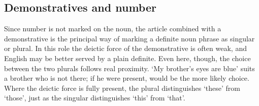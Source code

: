 \subsection{Demonstratives and number}\label{sec:dem-number}
Since number is not marked on the noun, the article combined with a demonstrative is the principal way of marking a definite noun phrase as singular or plural.
In this role the deictic force of the demonstrative is often weak, and English may be better served by a plain definite.
Even here, though, the choice between the two plurals follows real proximity.  `My brother's eyes are blue' suits a brother who is not there; if he were present,  would be the more likely choice. Where the deictic force is fully present, the plural distinguishes  `these' from  `those', just as the singular distinguishes  `this' from  `that'.

